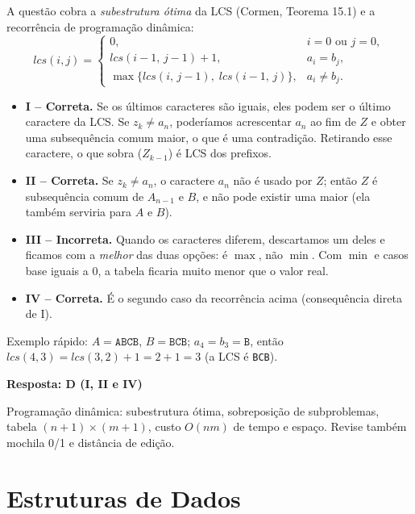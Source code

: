 \documentclass[11pt,a4paper]{article}
\newcommand{\solucao}{\par\medskip\noindent{\large\bfseries\color{verde}Solução}\par\smallskip}
\newcommand{\resposta}[1]{\begin{gabarito}\textbf{Resposta: #1}\end{gabarito}}
\begin{document}
\solucao
A questão cobra a \emph{subestrutura ótima} da LCS (Cormen, Teorema 15.1) e a recorrência de
programação dinâmica:
\[
lcs(i,j) =
\begin{cases}
0, & i = 0 \text{ ou } j = 0,\\
lcs(i-1,\,j-1) + 1, & a_i = b_j,\\
\max\{lcs(i,\,j-1),\; lcs(i-1,\,j)\}, & a_i \ne b_j.
\end{cases}
\]
\begin{itemize}
  \item \textbf{I -- Correta.} Se os últimos caracteres são iguais, eles podem ser o último caractere
  da LCS. Se $z_k \neq a_n$, poderíamos acrescentar $a_n$ ao fim de $Z$ e obter uma subsequência comum
  maior, o que é uma contradição. Retirando esse caractere, o que sobra ($Z_{k-1}$) é LCS dos prefixos.
  \item \textbf{II -- Correta.} Se $z_k \ne a_n$, o caractere $a_n$ não é usado por $Z$; então $Z$ é
  subsequência comum de $A_{n-1}$ e $B$, e não pode existir uma maior (ela também serviria para $A$ e $B$).
  \item \textbf{III -- Incorreta.} Quando os caracteres diferem, descartamos um deles e ficamos com a
  \emph{melhor} das duas opções: é $\max$, não $\min$. Com $\min$ e casos base iguais a 0, a tabela
  ficaria muito menor que o valor real.
  \item \textbf{IV -- Correta.} É o segundo caso da recorrência acima (consequência direta de I).
\end{itemize}
Exemplo rápido: $A = \texttt{ABCB}$, $B = \texttt{BCB}$; $a_4 = b_3 = \texttt{B}$, então
$lcs(4,3) = lcs(3,2)+1 = 2+1 = 3$ (a LCS é \texttt{BCB}).

\resposta{D (I, II e IV)}

\begin{dica}
Programação dinâmica: subestrutura ótima, sobreposição de subproblemas, tabela $(n+1)\times(m+1)$,
custo $O(nm)$ de tempo e espaço. Revise também mochila 0/1 e distância de edição.
\end{dica}

\section{Estruturas de Dados}

\end{document}
